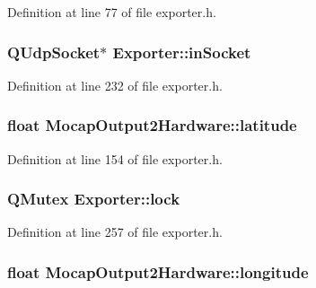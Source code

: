 \-Definition at line 77 of file exporter.\-h.

\hypertarget{group___mo_cap_plugin_ga01c0037d3abe6f3cfc9521e865cbe65f}{
\subsubsection[{in\-Socket}]{\setlength{\rightskip}{0pt plus 5cm}\-Q\-Udp\-Socket$\ast$ {\bf \-Exporter\-::in\-Socket}}}\label{group___mo_cap_plugin_ga01c0037d3abe6f3cfc9521e865cbe65f}


\-Definition at line 232 of file exporter.\-h.

\hypertarget{group___mo_cap_plugin_gacfbf5cf513abfc200b4fd5c14dad294c}{
\subsubsection[{latitude}]{\setlength{\rightskip}{0pt plus 5cm}float {\bf \-Mocap\-Output2\-Hardware\-::latitude}}}\label{group___mo_cap_plugin_gacfbf5cf513abfc200b4fd5c14dad294c}


\-Definition at line 154 of file exporter.\-h.

\hypertarget{group___mo_cap_plugin_ga55a5f9c6eb2d80cfc96523f4592f5417}{
\subsubsection[{lock}]{\setlength{\rightskip}{0pt plus 5cm}\-Q\-Mutex {\bf \-Exporter\-::lock}}}\label{group___mo_cap_plugin_ga55a5f9c6eb2d80cfc96523f4592f5417}


\-Definition at line 257 of file exporter.\-h.

\hypertarget{group___mo_cap_plugin_ga65a9de4b87de2a4aaff0760f2b912407}{
\subsubsection[{longitude}]{\setlength{\rightskip}{0pt plus 5cm}float {\bf \-Mocap\-Output2\-Hardware\-::longitude}}}\label{group___mo_cap_plugin_ga65a9de4b87de2a4aaff0760f2b912407}


